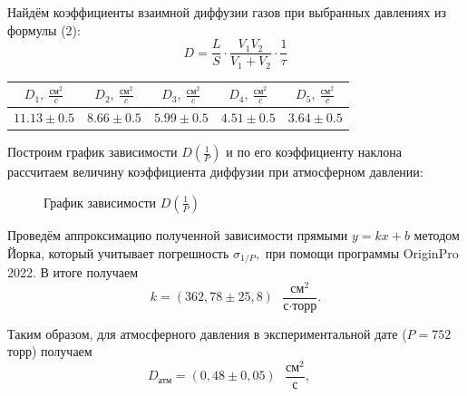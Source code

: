 \documentclass[a4paper, 12pt]{article}%
\begin{document}
 Найдём коэффициенты взаимной диффузии газов при выбранных давлениях из формулы (2):
 \[
  D=\frac{L}{S} \cdot \frac{V_1V_2}{V_1+V_2} \cdot \frac{1}{\tau}
  \]
\begin{center}
\begin{tabular}{|c|c|c|c|c|}
\hline $D_1,\ \frac{\text{см}^2}{c}$ & $D_2,\ \frac{\text{см}^2}{c}$ & $D_3,\ \frac{\text{см}^2}{c}$ & $D_4,\ \frac{\text{см}^2}{c}$ & $D_5,\ \frac{\text{см}^2}{c}$ \\
\hline $11.13 \pm 0.5$ & $8.66 \pm 0.5$ & $5.99 \pm 0.5$ &  $4.51 \pm 0.5$ & $3.64 \pm 0.5$ \\\hline
	\end{tabular}
\end{center}
Построим график зависимости $D(\frac{1}{P})$ и по его коэффициенту наклона рассчитаем величину коэффициента диффузии при атмосферном давлении:
\begin{figure}[h]
	\caption{График зависимости $D(\frac{1}{P})$}
\end{figure}

Проведём аппроксимацию полученной зависимости прямыми $ y =kx + b $ методом Йорка, который учитывает погрешность $ \sigma_{1/P}, $ при помощи программы OriginPro 2022. В итоге получаем \[ k = (362,78 \pm 25,8) \text{ } \frac{\text{см}^2}{\text{с}\cdot\text{торр}}. \]

Таким образом, для атмосферного давления в экспериментальной дате ($ P=752 $ торр) получаем \[ \boxed{D_\text{атм} = (0,48\pm0,05) \text{ } \frac{\text{см}^2}{\text{с}}}, \quad \]
\end{document}
